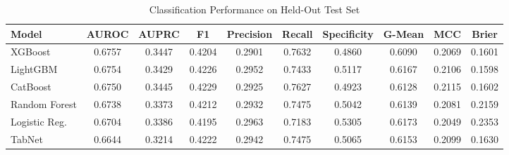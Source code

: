 \begin{table}
\centering
\caption{Classification Performance on Held-Out Test Set}
\label{tab:results}
\begin{tabular}{lccccccccc}
\toprule
Model & AUROC & AUPRC & F1 & Precision & Recall & Specificity & G-Mean & MCC & Brier \\
\midrule
XGBoost & 0.6757 & 0.3447 & 0.4204 & 0.2901 & 0.7632 & 0.4860 & 0.6090 & 0.2069 & 0.1601 \\
LightGBM & 0.6754 & 0.3429 & 0.4226 & 0.2952 & 0.7433 & 0.5117 & 0.6167 & 0.2106 & 0.1598 \\
CatBoost & 0.6750 & 0.3445 & 0.4229 & 0.2925 & 0.7627 & 0.4923 & 0.6128 & 0.2115 & 0.1602 \\
Random Forest & 0.6738 & 0.3373 & 0.4212 & 0.2932 & 0.7475 & 0.5042 & 0.6139 & 0.2081 & 0.2159 \\
Logistic Reg. & 0.6704 & 0.3386 & 0.4195 & 0.2963 & 0.7183 & 0.5305 & 0.6173 & 0.2049 & 0.2353 \\
TabNet & 0.6644 & 0.3214 & 0.4222 & 0.2942 & 0.7475 & 0.5065 & 0.6153 & 0.2099 & 0.1630 \\
\bottomrule
\end{tabular}
\end{table}
